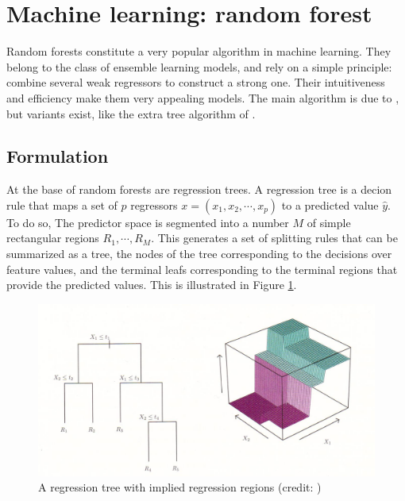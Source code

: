 \section{Machine learning: random forest}
\label{chapter3_section8}


Random forests constitute a very popular algorithm in machine learning. They belong to the class of ensemble learning models, and rely on a simple principle: combine several weak regressors to construct a strong one. Their intuitiveness and efficiency make them very appealing models. The main algorithm is due to \cite{Breiman2001}, but variants exist, like the extra tree algorithm of \cite{Geurts2006}.


\subsection{Formulation}
\label{chapter3_section8_subsection1}


At the base of random forests are regression trees. A regression tree is a decion rule that maps a set of $p$  regressors $x = (x_1, x_2, \cdots, x_p)$ to a predicted value $\hat{y}$. To do so, The predictor space is segmented into a number $M$ of simple rectangular regions $R_1, \cdots, R_M$. This generates a set of splitting rules that can be summarized as a tree, the nodes of the tree corresponding to the decisions over feature values, and the terminal leafs corresponding to the terminal regions that provide the predicted values. This is illustrated in Figure \ref{fig_c3_s8_ss1_1}.

\begin{figure}[H]
\centering
\includegraphics[scale=0.45]{images/regression_tree.png}
\caption{A regression tree with implied regression regions (credit: \cite{Gareth2013})}
\label{fig_c3_s8_ss1_1} 
\end{figure}

